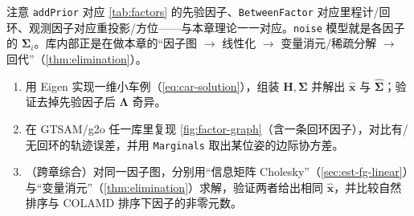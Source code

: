 \noindent 注意 \texttt{addPrior} 对应 \cref{tab:factors} 的先验因子、\texttt{BetweenFactor} 对应里程计/回环、观测因子对应重投影/方位——与本章理论一一对应。\texttt{noise} 模型就是各因子的 $\boldsymbol{\Sigma}_i$。库内部正是在做本章的“因子图 $\to$ 线性化 $\to$ 变量消元/稀疏分解 $\to$ 回代”（\cref{thm:elimination}）。

\begin{practice}
\begin{enumerate}
  \item 用 Eigen 实现一维小车例（\cref{eq:car-solution}），组装 $\mathbf{H},\boldsymbol{\Sigma}$ 并解出 $\hat{\mathbf{x}}$ 与 $\hat{\boldsymbol{\Sigma}}$；验证去掉先验因子后 $\boldsymbol{\Lambda}$ 奇异。
  \item 在 GTSAM/g2o 任一库里复现 \cref{fig:factor-graph}（含一条回环因子），对比有/无回环的轨迹误差，并用 \texttt{Marginals} 取出某位姿的边际协方差。
  \item （跨章综合）对同一因子图，分别用“信息矩阵 Cholesky”（\cref{sec:est-fg-linear}）与“变量消元”（\cref{thm:elimination}）求解，验证两者给出相同 $\hat{\mathbf{x}}$，并比较自然排序与 COLAMD 排序下因子的非零元数。
\end{enumerate}
\end{practice}

